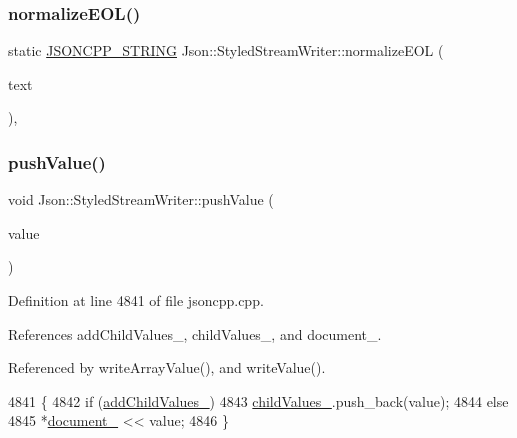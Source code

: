 \subsubsection{\texorpdfstring{normalize\+E\+O\+L()}{normalizeEOL()}}
{\footnotesize\ttfamily static \hyperlink{json_8h_a1e723f95759de062585bc4a8fd3fa4be}{J\+S\+O\+N\+C\+P\+P\+\_\+\+S\+T\+R\+I\+NG} Json\+::\+Styled\+Stream\+Writer\+::normalize\+E\+OL (\begin{DoxyParamCaption}\item[{const \hyperlink{json_8h_a1e723f95759de062585bc4a8fd3fa4be}{J\+S\+O\+N\+C\+P\+P\+\_\+\+S\+T\+R\+I\+NG} \&}]{text }\end{DoxyParamCaption})\hspace{0.3cm}{\ttfamily [static]}, {\ttfamily [private]}}

\mbox{\label{class_json_1_1_styled_stream_writer_a9adb47185695f07b1979d8f4c5347592}} 
\subsubsection{\texorpdfstring{push\+Value()}{pushValue()}}
{\footnotesize\ttfamily void Json\+::\+Styled\+Stream\+Writer\+::push\+Value (\begin{DoxyParamCaption}\item[{const \hyperlink{json_8h_a1e723f95759de062585bc4a8fd3fa4be}{J\+S\+O\+N\+C\+P\+P\+\_\+\+S\+T\+R\+I\+NG} \&}]{value }\end{DoxyParamCaption})\hspace{0.3cm}{\ttfamily [private]}}



Definition at line 4841 of file jsoncpp.\+cpp.



References add\+Child\+Values\+\_\+, child\+Values\+\_\+, and document\+\_\+.



Referenced by write\+Array\+Value(), and write\+Value().


\begin{DoxyCode}
4841                                                               \{
4842   \textcolor{keywordflow}{if} (\hyperlink{class_json_1_1_styled_stream_writer_a4e4bb7fc223b2652b72b523b1ce414fa}{addChildValues\_})
4843     \hyperlink{class_json_1_1_styled_stream_writer_aafd62e00a401df73fcacb2e410114b3d}{childValues\_}.push\_back(value);
4844   \textcolor{keywordflow}{else}
4845     *\hyperlink{class_json_1_1_styled_stream_writer_aa8c4e4576f5c3dcb10955d133a092dd6}{document\_} << value;
4846 \}
\end{DoxyCode}
\mbox{\label{class_json_1_1_styled_stream_writer_a74d8fb9beecd29759d7b79f430386358}} 
